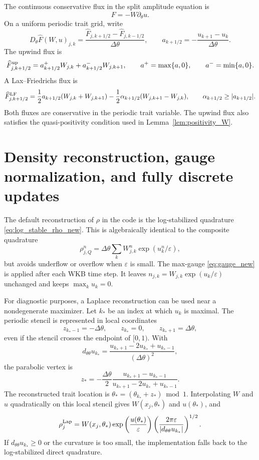 \documentclass[11pt]{article}
\begin{document}
The continuous conservative flux in the split amplitude equation is
\[
    F=-W\partial_\theta u.
\]
On a uniform periodic trait grid, write
\[
    D_\theta\widehat F(W,u)_{j,k}
    =\frac{\widehat F_{j,k+1/2}-\widehat F_{j,k-1/2}}{\Delta\theta},
    \qquad
    a_{k+1/2}=-\frac{u_{k+1}-u_k}{\Delta\theta}.
\]
The upwind flux is
\begin{equation}\label{eq:app_upwind_flux_new}
    \widehat F^{\rm up}_{j,k+1/2}
    =a_{k+1/2}^+ W_{j,k}+a_{k+1/2}^- W_{j,k+1},
    \qquad
    a^+=\max\{a,0\},
    \qquad
    a^-=\min\{a,0\}.
\end{equation}
A Lax--Friedrichs flux is
\begin{equation}\label{eq:app_LF_flux_new}
    \widehat F^{\rm LF}_{j,k+1/2}
    =\frac{1}{2}a_{k+1/2}(W_{j,k}+W_{j,k+1})
    -\frac{1}{2}\alpha_{k+1/2}(W_{j,k+1}-W_{j,k}),
    \qquad
    \alpha_{k+1/2}\ge |a_{k+1/2}|.
\end{equation}
Both fluxes are conservative in the periodic trait variable.  The upwind flux also satisfies the quasi-positivity condition used in Lemma~\ref{lem:positivity_W}.

\section{Density reconstruction, gauge normalization, and fully discrete updates}\label{app:reconstruction}

The default reconstruction of \(\rho\) in the code is the log-stabilized quadrature \eqref{eq:log_stable_rho_new}.  This is algebraically identical to the composite quadrature
\[
    \rho_{j,Q}^n=\Delta\theta\sum_k W_{j,k}^n\exp(u_k^n/\varepsilon),
\]
but avoids underflow or overflow when \(\varepsilon\) is small.  The max-gauge \eqref{eq:gauge_new} is applied after each WKB time step.  It leaves \(n_{j,k}=W_{j,k}\exp(u_k/\varepsilon)\) unchanged and keeps \(\max_k u_k=0\).

For diagnostic purposes, a Laplace reconstruction can be used near a nondegenerate maximizer.  Let \(k_*\) be an index at which \(u_k\) is maximal.  The periodic stencil is represented in local coordinates
\[
    z_{k_*-1}=-\Delta\theta,
    \qquad
    z_{k_*}=0,
    \qquad
    z_{k_*+1}=\Delta\theta,
\]
even if the stencil crosses the endpoint of \([0,1)\).  With
\[
    d_{\theta\theta}u_{k_*}
    =\frac{u_{k_*+1}-2u_{k_*}+u_{k_*-1}}{(\Delta\theta)^2},
\]
the parabolic vertex is
\begin{equation}\label{eq:laplace_vertex_new}
    z_*=-\frac{\Delta\theta}{2}
    \frac{u_{k_*+1}-u_{k_*-1}}{u_{k_*+1}-2u_{k_*}+u_{k_*-1}}.
\end{equation}
The reconstructed trait location is \(\theta_*=(\theta_{k_*}+z_*)\bmod 1\).  Interpolating \(W\) and \(u\) quadratically on this local stencil gives \(W(x_j,\theta_*)\) and \(u(\theta_*)\), and
\begin{equation}\label{eq:laplace_rho_new}
    \rho_j^{\rm Lap}
    =W(x_j,\theta_*)\exp\left(\frac{u(\theta_*)}{\varepsilon}\right)
    \left(\frac{2\pi\varepsilon}{|d_{\theta\theta}u_{k_*}|}\right)^{1/2}.
\end{equation}
If \(d_{\theta\theta}u_{k_*}\ge0\) or the curvature is too small, the implementation falls back to the log-stabilized direct quadrature.
\end{document}

